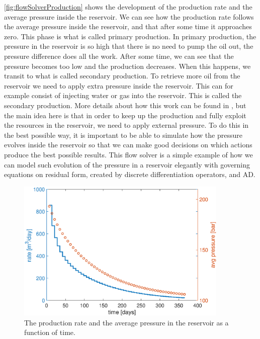 \autoref{fig:flowSolverProduction} shows the development of the production rate and the average pressure inside the reservoir. We can see how the production rate follows the average pressure inside the reservoir, and that after some time it approaches zero. This phase is what is called primary production. In primary production, the pressure in the reservoir is so high that there is no need to pump the oil out, the pressure difference does all the work. After some time, we can see that the pressure becomes too low and the production decreases. When this happens, we transit to what is called secondary production. To retrieve more oil from the reservoir we need to apply extra pressure inside the reservoir. This can for example consist of injecting water or gas into the reservoir. This is called the secondary production. More details about how this work can be found in \emph{\cite{lieMrstUrl}}, but the main idea here is that in order to keep up the production and fully exploit the resources in the reservoir, we need to apply external pressure. To do this in the best possible way, it is important to be able to simulate how the pressure evolves inside the reservoir so that we can make good decisions on which actions produce the best possible results. This flow solver is a simple example of how we can model such evolution of the pressure in a reservoir elegantly with governing equations on residual form, created by discrete differentiation operators, and AD.
\begin{figure}[H]
    \centering
    \includegraphics[width = 0.9\textwidth]{figures/flow_solver_production.eps}
    \caption{The production rate and the average pressure in the reservoir as a function of time.}
    \label{fig:flowSolverProduction}
\end{figure}

